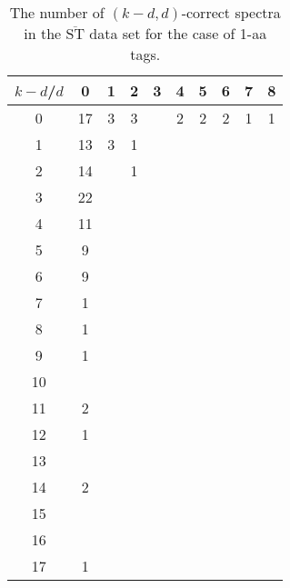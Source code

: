 \documentclass{article}[12pt]
\def\STbar{{\overline{\mathrm{ST}}}}
\begin{document}
\begin{landscape}

\begin{table}[h]\footnotesize
{\centering
\begin{tabular}{|c|c|
c|c|c|c|c|c|c|c|}
  \hline
  $k-d$/$d$ 
 & 0 & 1 & 2 & 3 & 4 & 5 & 6 & 7 & 8\\

  \hline
  \hline

0  & 17 & 3 & 3 &  & 2 & 2 & 2 & 1 & 1\\

1  & 13 & 3 & 1 &  &  &  &  &  & \\

2  & 14 &  & 1 &  &  &  &  &  & \\

3  & 22 &  &  &  &  &  &  &  & \\

4  & 11 &  &  &  &  &  &  &  & \\

5  & 9 &  &  &  &  &  &  &  & \\

6  & 9 &  &  &  &  &  &  &  & \\

7  & 1 &  &  &  &  &  &  &  & \\

8  & 1 &  &  &  &  &  &  &  & \\

9  & 1 &  &  &  &  &  &  &  & \\

10  &  &  &  &  &  &  &  &  & \\

11  & 2 &  &  &  &  &  &  &  & \\

12  & 1 &  &  &  &  &  &  &  & \\

13  &  &  &  &  &  &  &  &  & \\

14  & 2 &  &  &  &  &  &  &  & \\

15  &  &  &  &  &  &  &  &  & \\

16  &  &  &  &  &  &  &  &  & \\

17  & 1 &  &  &  &  &  &  &  & \\

  \hline
\end{tabular}
\par}
\centering
\caption{The number of $(k-d,d)$-correct spectra in the $\STbar$ data set for the case of 1-aa tags.}
\vspace{3mm}
\label{table:kd-1-correct-ST-bar}
\end{table}
\end{landscape}
\end{document}
